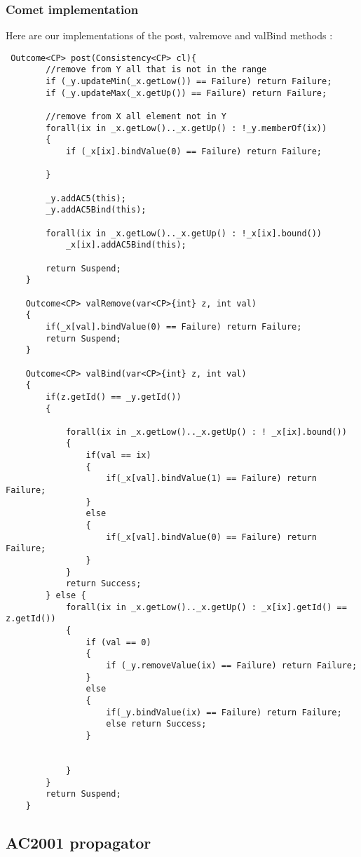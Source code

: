 \documentclass{eplDoc}
\begin{document}
\subsubsection{Comet implementation}
Here are our implementations of the post, valremove and valBind methods : 
\begin{lstlisting}
 Outcome<CP> post(Consistency<CP> cl){
        //remove from Y all that is not in the range 
        if (_y.updateMin(_x.getLow()) == Failure) return Failure;
        if (_y.updateMax(_x.getUp()) == Failure) return Failure;

        //remove from X all element not in Y
        forall(ix in _x.getLow().._x.getUp() : !_y.memberOf(ix))
        {
            if (_x[ix].bindValue(0) == Failure) return Failure;
   
        }

        _y.addAC5(this);
        _y.addAC5Bind(this);
        
        forall(ix in _x.getLow().._x.getUp() : !_x[ix].bound())
            _x[ix].addAC5Bind(this);

        return Suspend;
    }
    
    Outcome<CP> valRemove(var<CP>{int} z, int val)
    {
        if(_x[val].bindValue(0) == Failure) return Failure;
        return Suspend;
    }
    
    Outcome<CP> valBind(var<CP>{int} z, int val)
    {
        if(z.getId() == _y.getId())
        {

            forall(ix in _x.getLow().._x.getUp() : ! _x[ix].bound())
            {
                if(val == ix)
                {
                    if(_x[val].bindValue(1) == Failure) return Failure;
                }
                else 
                {
                    if(_x[val].bindValue(0) == Failure) return Failure;
                }
            }
            return Success;
        } else {
            forall(ix in _x.getLow().._x.getUp() : _x[ix].getId() == z.getId())
            {
                if (val == 0)
                { 
                    if (_y.removeValue(ix) == Failure) return Failure;
                }
                else
                {
                    if(_y.bindValue(ix) == Failure) return Failure;
                    else return Success;
                }
                

            }
        }
        return Suspend;
    }
\end{lstlisting}

\subsection{AC2001 propagator} %
\end{document}
